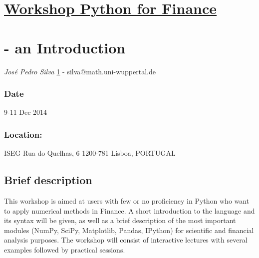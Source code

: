 






    
    \section{\href{http://financialmathematics.pt/python2014/}{Workshop
Python for Finance}}\label{workshop-python-for-finance}

\section{- an Introduction}\label{an-introduction}

\emph{José Pedro Silva}
\href{http://www-num.math.uni-wuppertal.de/en/amna/people/jose-pedro-silva.html}{1}
- silva@math.uni-wuppertal.de

\subsubsection{Date}\label{date}

9-11 Dec 2014

\subsubsection{Location:}\label{location}

ISEG Rua do Quelhas, 6 1200-781 Lisboa, PORTUGAL

    \subsection{Brief description}\label{brief-description}

This workshop is aimed at users with few or no proficiency in Python who
want to apply numerical methods in Finance. A short introduction to the
language and its syntax will be given, as well as a brief description of
the most important modules (NumPy, SciPy, Matplotlib, Pandas, IPython)
for scientific and financial analysis purposes. The workshop will
consist of interactive lectures with several examples followed by
practical sessions.

